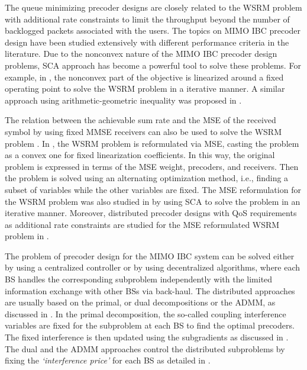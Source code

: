 The queue minimizing precoder designs are closely related to the \ac{WSRM} problem with additional rate constraints to limit the throughput beyond the number of backlogged packets associated with the users. The topics on \ac{MIMO} \ac{IBC} precoder design have been studied extensively with different performance criteria in the literature. Due to the nonconvex nature of the \ac{MIMO} \ac{IBC} precoder design problems, \ac{SCA} approach has become a powerful tool to solve these problems. For example, in \cite{sin_algorithm}, the nonconvex part of the objective is linearized around a fixed operating point to solve the \ac{WSRM} problem in a iterative manner. A similar approach using arithmetic-geometric inequality was proposed in \cite{tran2012fast}.

The relation between the achievable sum rate and the \ac{MSE} of the received symbol by using fixed \ac{MMSE} receivers can also be used to solve the \ac{WSRM} problem \cite{mse_duality}. In \cite{christensen2008weighted,wmmse_shi}, the \ac{WSRM} problem is reformulated via \ac{MSE}, casting the problem as a convex one for fixed linearization coefficients. In this way, the original problem is expressed in terms of the \ac{MSE} weight, precoders, and receivers. Then the problem is solved using an alternating optimization method, i.e., finding a subset of variables while the other variables are fixed. The \ac{MSE} reformulation for the \ac{WSRM} problem was also studied in \cite{kaleva2012weighted} by using \ac{SCA} to solve the problem in an iterative manner. Moreover, distributed precoder designs with \ac{QoS} requirements as additional rate constraints are studied for the \ac{MSE} reformulated \ac{WSRM} problem in \cite{kaleva2013decentralized}.

The problem of precoder design for the \ac{MIMO} \ac{IBC} system can be solved either by using a centralized controller or by using decentralized algorithms, where each \ac{BS} handles the corresponding subproblem independently with the limited information exchange with other \acp{BS} via back-haul. The distributed approaches are usually based on the primal, or dual decompositions or the \ac{ADMM}, as discussed in \cite{palomar2006tutorial,boyd2011distributed}. In the  primal decomposition, the so-called coupling interference variables are fixed for the subproblem at each \ac{BS} to find the optimal precoders. The fixed interference is then updated using the subgradients as discussed in \cite{pennanen2011decentralized}. The dual and the \ac{ADMM} approaches control the distributed subproblems by fixing the \emph{`interference price'} for each \ac{BS} as detailed in \cite{tolli2011decentralized}.


